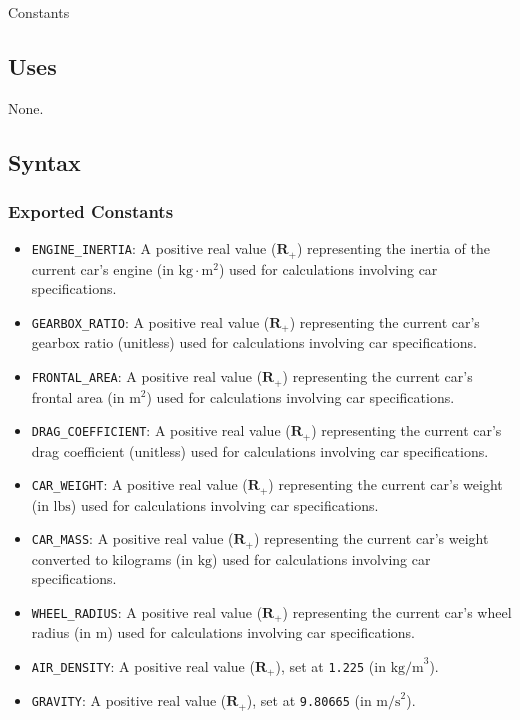 \documentclass[12pt, titlepage]{article}
\begin{document}
Constants

\subsection{Uses}
None.

\subsection{Syntax}

\subsubsection{Exported Constants}

\begin{itemize}
  \item \texttt{ENGINE\_INERTIA}: A positive real value ($\mathbf{R}_{+}$) representing the inertia of the current car's engine (in $\text{kg}\cdot\text{m}^2$) used for calculations involving car specifications.
  \item \texttt{GEARBOX\_RATIO}: A positive real value ($\mathbf{R}_{+}$) representing the current car's gearbox ratio (unitless) used for calculations involving car specifications.
  \item \texttt{FRONTAL\_AREA}: A positive real value ($\mathbf{R}_{+}$) representing the current car's frontal area (in $\text{m}^2$) used for calculations involving car specifications.
  \item \texttt{DRAG\_COEFFICIENT}: A positive real value ($\mathbf{R}_{+}$) representing the current car's drag coefficient (unitless) used for calculations involving car specifications.
  \item \texttt{CAR\_WEIGHT}: A positive real value ($\mathbf{R}_{+}$) representing the current car's weight (in $\text{lbs}$) used for calculations involving car specifications.
  \item \texttt{CAR\_MASS}: A positive real value ($\mathbf{R}_{+}$) representing the current car's weight converted to kilograms (in $\text{kg}$) used for calculations involving car specifications.
  \item \texttt{WHEEL\_RADIUS}: A positive real value ($\mathbf{R}_{+}$) representing the current car's wheel radius (in $\text{m}$) used for calculations involving car specifications.
  \item \texttt{AIR\_DENSITY}: A positive real value ($\mathbf{R}_{+}$), set at \texttt{1.225} (in $\text{kg/m}^3$).
  \item \texttt{GRAVITY}: A positive real value ($\mathbf{R}_{+}$), set at \texttt{9.80665} (in $\text{m/s}^2$).

\end{itemize}
\end{document}
